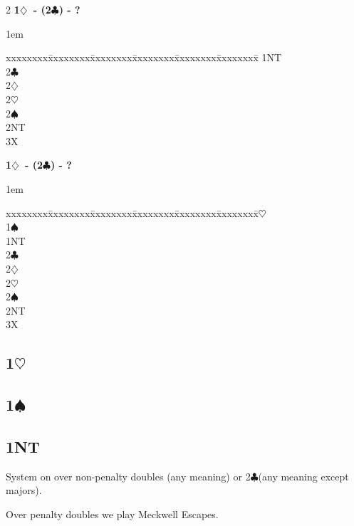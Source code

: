 \documentclass[10pt]{article}
\renewcommand{\c}{$\clubsuit$}
\renewcommand{\d}{$\diamondsuit$}
\newcommand{\h}{$\heartsuit$}
\newcommand{\s}{$\spadesuit$}
\newenvironment{bidtable}[1][]
{\textbf{#1}
  \begin{adjustwidth}{1em}{}
    \addvspace{2pt}
    \begin{tabbing}
      xxxxxxxx\=xxxxxxxx\=xxxxxxxx\=xxxxxxxx\=xxxxxxxx\=xxxxxxxx\=\kill}
{\end{tabbing}\end{adjustwidth}\bigskip}%
\newcommand{\pdfh}{\texorpdfstring{\h{}}{H}}
\newcommand{\pdfs}{\texorpdfstring{\s{}}{S}}
\begin{document}
\begin{multicols*}{2}
\begin{bidtable}[1\d\ - (2\c) - ?]
1NT \>                                \\
2\c \>                                \\
2\d \>                                \\
2\h \>                                \\
2\s \>                                \\
2NT \>                                \\
3X  \>                                \\
\end{bidtable}
\begin{bidtable}[1\d\ - (2\c) - ?]
1\h \>                                \\
1\s \>                                \\
1NT \>                                \\
2\c \>                                \\
2\d \>                                \\
2\h \>                                \\
2\s \>                                \\
2NT \>                                \\
3X  \>                                \\
\end{bidtable}
\subsection{1\pdfh}
\subsection{1\pdfs}
\subsection{1NT}

System on over non-penalty doubles (any meaning) or 2\c (any meaning except majors).

Over penalty doubles we play Meckwell Escapes.


\end{multicols*}
\end{document}
